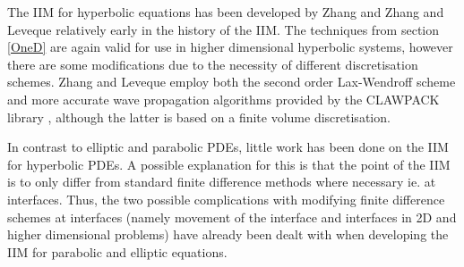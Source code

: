 The IIM for hyperbolic equations has been developed by Zhang \cite{zhang96} and Zhang and Leveque \cite{zhangleveque97} relatively early in the history of the IIM.
The techniques from section \ref{OneD} are again valid for use in higher dimensional hyperbolic systems, however there are some modifications due to the necessity of different discretisation schemes.
Zhang and Leveque \cite{zhangleveque97} employ both the second order Lax-Wendroff scheme and more accurate wave propagation algorithms provided by the CLAWPACK library \cite{leveque93}, although the latter is based on a finite volume discretisation.

In contrast to elliptic and parabolic PDEs, little work has been done on the IIM for hyperbolic PDEs.
A possible explanation for this is that the point of the IIM is to only differ from standard finite difference methods where necessary ie. at interfaces.
Thus, the two possible complications with modifying finite difference schemes at interfaces (namely movement of the interface and interfaces in 2D and higher dimensional problems) have already been dealt with when developing the IIM for parabolic and elliptic equations.
